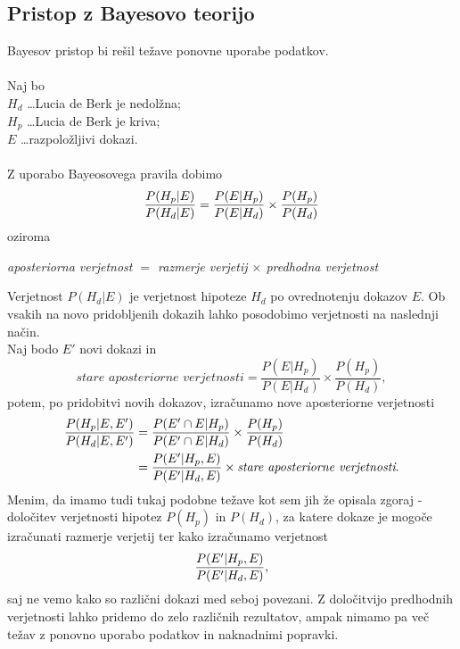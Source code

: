 \documentclass[fin1, tisk]{fmfdelo}
\theoremstyle{definition}
\theoremstyle{trditev}
\theoremstyle{izrek}
\begin{document}
\subsection{Pristop z Bayesovo teorijo}
Bayesov pristop bi rešil težave ponovne uporabe podatkov.\\\\
Naj bo\\
$H_d$ \dots Lucia de Berk je nedolžna;\\
$H_p$ \dots Lucia de Berk je kriva;\\
$E$ \dots razpoložljivi dokazi.\\\\
Z uporabo Bayeosovega pravila dobimo
\[
    \frac{P(H_p \lvert E)}{P(H_d \lvert E)} = \frac{P(E \lvert H_p)}{P(E \lvert H_d)} \times \frac{P(H_p)}{P(H_d)} \vspace{2mm}
\]
oziroma\\
\begin{center}
    \textit{aposteriorna verjetnost $=$ razmerje verjetij $\times$ predhodna verjetnost}  
\end{center}
Verjetnost $P(H_d \lvert E)$ je verjetnost hipoteze $H_d$ po ovrednotenju dokazov $E$. Ob vsakih na novo pridobljenih dokazih lahko posodobimo 
verjetnosti na naslednji način.\\
Naj bodo $E'$ novi dokazi in 
\[
    \textit{stare aposteriorne verjetnosti}  = \frac{P(E \lvert H_p)}{P(E \lvert H_d)} \times \frac{P(H_p)}{P(H_d)},
\]
potem, po pridobitvi novih dokazov, izračunamo nove aposteriorne verjetnosti
\begin{align*}
    \frac{P(H_p \lvert E, E')}{P(H_d \lvert E, E')} & = \frac{P(E' \cap E \lvert H_p)}{P(E' \cap E \lvert H_d)} \times \frac{P(H_p)}{P(H_d)} \\ \vspace{2mm}
    & = \frac{P(E' \lvert H_p, E)}{P(E' \lvert H_d, E)} \times \textit{stare aposteriorne verjetnosti}. \vspace{2mm}
\end{align*}
Menim, da imamo tudi tukaj podobne težave kot sem jih že opisala zgoraj - določitev verjetnosti hipotez $P(H_p)$ in $P(H_d)$, za katere dokaze je mogoče 
izračunati razmerje verjetij ter kako izračunamo verjetnost \[\frac{P(E' \lvert H_p, E)}{P(E' \lvert H_d, E)}, \vspace{2mm}\] saj ne vemo kako 
so različni dokazi med seboj povezani. Z določitvijo predhodnih verjetnosti lahko pridemo do zelo različnih rezultatov, ampak nimamo pa več težav z 
ponovno uporabo podatkov in naknadnimi popravki.
\end{document}
